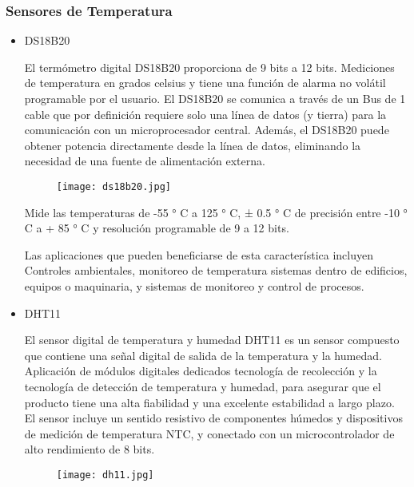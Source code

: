 \subsubsection{Sensores de Temperatura}
	\begin{itemize}
		\item DS18B20
			\par \noindent
				El termómetro digital DS18B20 proporciona de 9 bits a 12 bits.
				Mediciones de temperatura en grados celsius y tiene una función de alarma no volátil programable por el usuario. El DS18B20 se comunica a través de un
				Bus de 1 cable que por definición requiere solo una línea de datos
				(y tierra) para la comunicación con un microprocesador central.
				Además, el DS18B20 puede obtener potencia
				directamente desde la línea de datos, eliminando
				la necesidad de una fuente de alimentación externa.
				
			\begin{figure}[H]
				\centering
				\texttt{[image: ds18b20.jpg]}
				\caption{}
			\end{figure}
				
			\par \noindent
				Mide las temperaturas de -55 ° C a 125 ° C, ± 0.5 ° C de  precisión entre -10 ° C a + 85 ° C y resolución programable de 9 a 12 bits.

			\par \noindent
				Las aplicaciones que pueden beneficiarse de esta característica incluyen
				Controles ambientales, monitoreo de temperatura
				sistemas dentro de edificios, equipos o maquinaria, y
				sistemas de monitoreo y control de procesos. 
				
\clearpage
\thispagestyle{plain}
				
		\item DHT11
			\par \noindent
				El sensor digital de temperatura y humedad DHT11 es un sensor compuesto que contiene una
				señal digital de salida de la temperatura y la humedad. Aplicación de módulos digitales dedicados
				tecnología de recolección y la tecnología de detección de temperatura y humedad, para asegurar que
				el producto tiene una alta fiabilidad y una excelente estabilidad a largo plazo. El sensor incluye un sentido resistivo
				de componentes húmedos y dispositivos de medición de temperatura NTC, y conectado con un
				microcontrolador de alto rendimiento de 8 bits.
				
			\begin{figure}[H]
				\centering
				\texttt{[image: dh11.jpg]}
				\caption{}
			\end{figure}
				

\end{itemize}
